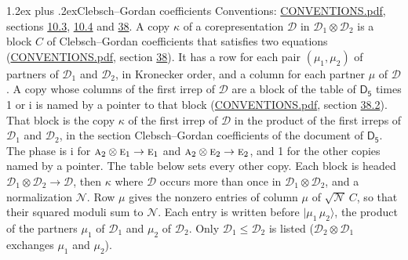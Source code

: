 \documentclass[10pt,a4paper]{article}
\makeatletter
\renewcommand\section{\@startsection{section}{1}{\z@}{-3ex plus -1ex minus -.2ex}%
  {1.2ex plus .2ex}{\normalfont\large\sffamily\bfseries\color{parttitle}}}
\numberwithin{equation}{section}
\newcommand{\grp}[1]{\mathsf{#1}}
\newcommand{\irr}[1]{\text{\normalfont\scshape #1}}
\newcommand{\iunit}{\mathrm{i}}
\newcommand{\irrprod}{\otimes}
\newcommand{\mult}{\kappa}
\newcommand{\intx}{\mu}
\newcommand{\cgnorm}{\mathcal{N}}
\newcommand{\prodket}[2]{\lvert {#1}\,{#2}\rangle}
\makeatother
\begin{document}
\section{Clebsch--Gordan coefficients}\label{s:clebsch_gordan}
Conventions: \href{../../CONVENTIONS.pdf}{CONVENTIONS.pdf}, sections \href{../../../rotation/CONVENTIONS.pdf\#conv.10.3}{10.3}, \href{../../../rotation/CONVENTIONS.pdf\#conv.10.4}{10.4} and \href{../../CONVENTIONS.pdf\#conv.38}{38}.
\leavevmode\label{n:index.copy}\label{n:matrix.cg.stored}A copy $\mult$ of a corepresentation $\mathcal{D}$ in $\mathcal{D}_1\irrprod\mathcal{D}_2$ is a block $C$ of Clebsch--Gordan coefficients that satisfies two equations (\href{../../CONVENTIONS.pdf}{CONVENTIONS.pdf}, section \href{../../CONVENTIONS.pdf\#conv.38}{38}). \label{n:index.cg}It has a row for each pair $(\intx_1, \intx_2)$ of partners of $\mathcal{D}_1$ and $\mathcal{D}_2$, in Kronecker order, and a column for each partner $\intx$ of $\mathcal{D}$.
A copy whose columns of the first irrep of $\mathcal{D}$ are a block of the table of $\grp{D_{5}}$ times 1 or $\iunit$ is named by a pointer to that block (\href{../../CONVENTIONS.pdf}{CONVENTIONS.pdf}, section \href{../../CONVENTIONS.pdf\#conv.38.2}{38.2}). That block is the copy $\mult$ of the first irrep of $\mathcal{D}$ in the product of the first irreps of $\mathcal{D}_1$ and $\mathcal{D}_2$, in the section Clebsch--Gordan coefficients of the document of \href{../../../rotation/data/pdf/D5.pdf}{$\grp{D_{5}}$}. The phase is $\iunit$ for $\irr{a}_{2}\irrprod \irr{e}_{1}\to \irr{e}_{1}$ and $\irr{a}_{2}\irrprod \irr{e}_{2}\to \irr{e}_{2}$, and 1 for the other copies named by a pointer. The table below sets every other copy.
Each block is headed $\mathcal{D}_1\irrprod\mathcal{D}_2\to\mathcal{D}$, then $\mult$ where $\mathcal{D}$ occurs more than once in $\mathcal{D}_1\irrprod\mathcal{D}_2$, and a normalization $\cgnorm$. Row $\intx$ gives the nonzero entries of column $\intx$ of $\sqrt{\cgnorm}\,C$, so that their squared moduli sum to $\cgnorm$. \label{n:vector.ket.product}Each entry is written before $\prodket{\intx_1}{\intx_2}$, the product of the partners $\intx_1$ of $\mathcal{D}_1$ and $\intx_2$ of $\mathcal{D}_2$. Only $\mathcal{D}_1 \le \mathcal{D}_2$ is listed ($\mathcal{D}_2\irrprod\mathcal{D}_1$ exchanges $\intx_1$ and $\intx_2$).
\end{document}
